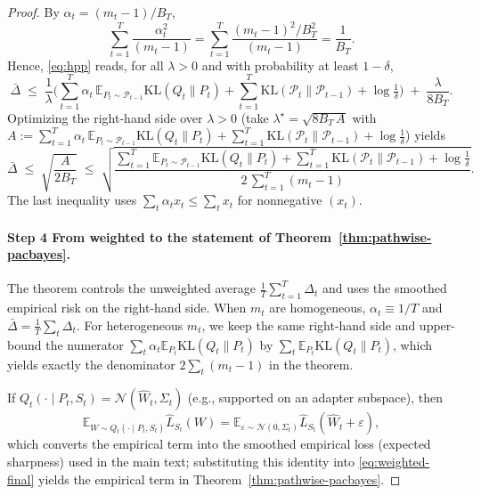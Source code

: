 \documentclass[10pt]{article} %
\begin{document}
\begin{proof}

By $\alpha_t=(m_t-1)/B_T$,
\[
\sum_{t=1}^T \frac{\alpha_t^2}{(m_t-1)}
=\sum_{t=1}^T \frac{(m_t-1)^2/B_T^2}{(m_t-1)}
=\frac{1}{B_T}.
\]
Hence, \eqref{eq:hpp} reads, for all $\lambda>0$ and with probability at least $1-\delta$,
\begin{equation}
\label{eq:gap-preopt}
\bar\Delta
\;\le\;
\frac{1}{\lambda}\Big(
\sum_{t=1}^T \alpha_t\,\mathbb E_{P_t\sim\mathcal P_{t-1}}\mathrm{KL}(Q_t\|P_t)
+ \sum_{t=1}^T \mathrm{KL}(\mathcal P_t\|\mathcal P_{t-1})
+ \log\tfrac1\delta\Big)
\;+\;
\frac{\lambda}{8B_T}.
\end{equation}
Optimizing the right-hand side over $\lambda>0$ (take $\lambda^\star=\sqrt{8B_T\,A}$ with
$A:=\sum_{t=1}^T \alpha_t\,\mathbb E_{P_t\sim\mathcal P_{t-1}}\mathrm{KL}(Q_t\|P_t)
+ \sum_{t=1}^T \mathrm{KL}(\mathcal P_t\|\mathcal P_{t-1}) + \log\tfrac1\delta$) yields
\begin{equation}
\label{eq:weighted-final}
\bar\Delta
\;\le\;
\sqrt{\frac{A}{2B_T}}
\;\le\;
\sqrt{\frac{
\sum_{t=1}^T \mathbb E_{P_t\sim\mathcal P_{t-1}}\mathrm{KL}(Q_t\|P_t)
+ \sum_{t=1}^T \mathrm{KL}(\mathcal P_t\|\mathcal P_{t-1})
+ \log\tfrac1\delta}{2\,\sum_{t=1}^T (m_t-1)}}.
\end{equation}
The last inequality uses $\sum_t \alpha_t x_t \le \sum_t x_t$ for nonnegative $(x_t)$.

\paragraph{Step 4 From weighted to the statement of Theorem~\ref{thm:pathwise-pacbayes}.}
The theorem controls the unweighted average $\frac1T\sum_{t=1}^T \Delta_t$ and uses the smoothed empirical risk on the right-hand side.
When $m_t$ are homogeneous, $\alpha_t\equiv 1/T$ and $\bar\Delta=\frac1T\sum_t\Delta_t$.
For heterogeneous $m_t$, we keep the same right-hand side and upper-bound the numerator $\sum_t \alpha_t \mathbb E_{P_t}\mathrm{KL}(Q_t\|P_t)$ by $\sum_t \mathbb E_{P_t}\mathrm{KL}(Q_t\|P_t)$, which yields exactly the denominator $2\sum_t(m_t-1)$ in the theorem.


If $Q_t(\cdot\mid P_t,S_t)=\mathcal N(\hat W_t,\Sigma_t)$ (e.g., supported on an adapter subspace), then
\[
\mathbb E_{W\sim Q_t(\cdot\mid P_t,S_t)}\hat L_{S_t}(W)
=\mathbb E_{\varepsilon\sim\mathcal N(0,\Sigma_t)}\hat L_{S_t}(\hat W_t+\varepsilon),
\]
which converts the empirical term into the smoothed empirical loss (expected sharpness) used in the main text; substituting this identity into \eqref{eq:weighted-final} yields the empirical term in Theorem~\ref{thm:pathwise-pacbayes}.

\end{proof}
\end{document}
